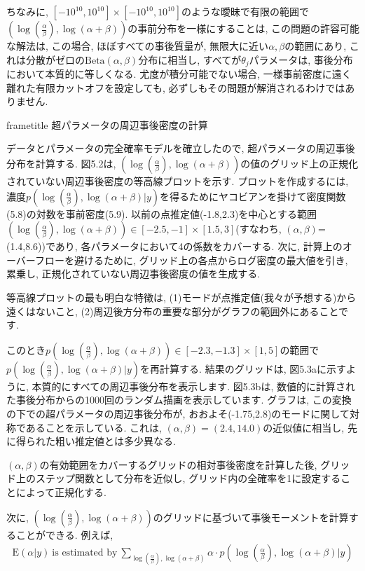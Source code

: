 \documentclass[10pt,dvipdfmx,a4]{beamer}
\newcommand{\eqn}[1]{\begin{align*}#1\end{align*}}
\newcommand{\dbox}[1]{\begin{beamercolorbox}[wd=122mm, sep=0pt, shadow=false, rounded=false]{frametitle} { #1}\end{beamercolorbox}}
\begin{document}
\begin{frame}
ちなみに, $[-10^{10},10^{10}]\times[-10^{10},10^{10}]$のような曖昧で有限の範囲で$(\log(\tfrac{\alpha}{\beta}), \log(\alpha+\beta))$の事前分布を一様にすることは,  この問題の許容可能な解法は, この場合, ほぼすべての事後質量が, 無限大に近い$\alpha,\beta$の範囲にあり, これは分散がゼロの$\text{Beta}(\alpha,\beta)$分布に相当し, すべてが$\theta_j$パラメータは, 事後分布において本質的に等しくなる.
尤度が積分可能でない場合, 一様事前密度に遠く離れた有限カットオフを設定しても, 必ずしもその問題が解消されるわけではありません.

\dbox{超パラメータの周辺事後密度の計算}
データとパラメータの完全確率モデルを確立したので, 超パラメータの周辺事後分布を計算する.
図5.2は, $(\log(\tfrac{\alpha}{\beta}), \log(\alpha+\beta))$の値のグリッド上の正規化されていない周辺事後密度の等高線プロットを示す.
プロットを作成するには, 濃度$p(\log(\tfrac{\alpha}{\beta}), \log(\alpha+\beta)|y)$を得るためにヤコビアンを掛けて密度関数(5.8)の対数を事前密度(5.9).
以前の点推定値(-1.8,2.3)を中心とする範囲$(\log(\tfrac{\alpha}{\beta}), \log (\alpha+\beta))\in [-2.5, -1]\times[1.5,3]$(すなわち, $(\alpha,\beta)$=(1.4,8.6))であり, 各パラメータにおいて4の係数をカバーする.
次に, 計算上のオーバーフローを避けるために, グリッド上の各点からログ密度の最大値を引き, 累乗し, 正規化されていない周辺事後密度の値を生成する.
\end{frame}


\begin{frame}
等高線プロットの最も明白な特徴は, (1)モードが点推定値(我々が予想する)から遠くはないこと, (2)周辺後方分布の重要な部分がグラフの範囲外にあることです.

このとき$p(\log(\tfrac{\alpha}{\beta}), \log(\alpha+\beta))\in[-2.3, -1.3]\times[1,5]$の範囲で$p(\log(\tfrac{\alpha}{\beta}), \log(\alpha+\beta)|y)$を再計算する.
結果のグリッドは, 図5.3aに示すように, 本質的にすべての周辺事後分布を表示します.
図5.3bは, 数値的に計算された事後分布からの1000回のランダム描画を表示しています.
グラフは, この変換の下での超パラメータの周辺事後分布が, おおよそ(-1.75,2.8)のモードに関して対称であることを示している.
これは, $(\alpha,\beta)=(2.4,14.0)$の近似値に相当し, 先に得られた粗い推定値とは多少異なる.

$(\alpha,\beta)$の有効範囲をカバーするグリッドの相対事後密度を計算した後, グリッド上のステップ関数として分布を近似し, グリッド内の全確率を1に設定することによって正規化する.

次に, $(\log(\tfrac{\alpha}{\beta}), \log(\alpha+\beta))$のグリッドに基づいて事後モーメントを計算することができる.
例えば,
\eqn{\text{E}(\alpha|y)\ \text{is estimated by}\ \sum_{\log(\tfrac{\alpha}{\beta}),\log(\alpha+\beta)}\alpha\cdot p(\log(\tfrac{\alpha}{\beta}),\log(\alpha+\beta)|y)}
\end{frame}
\end{document}
